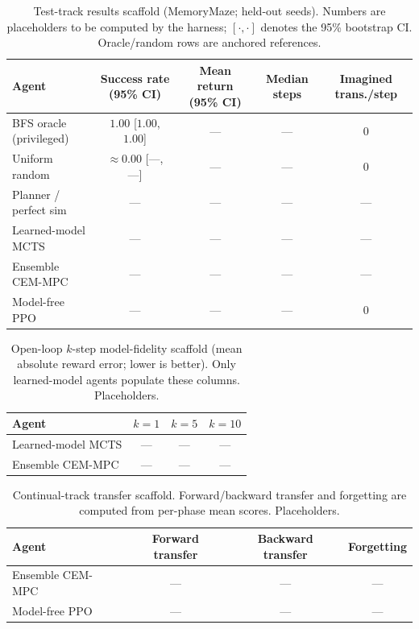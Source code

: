 \documentclass[11pt]{article}
\begin{document}
\begin{table}[t]
\centering
\caption{Test-track results scaffold (MemoryMaze; held-out seeds). Numbers are placeholders to be computed by the harness; $[\cdot,\cdot]$ denotes the 95\% bootstrap CI. Oracle/random rows are anchored references.}
\label{tab:results-memorymaze}
\begin{tabular}{lcccc}
\toprule
Agent & Success rate (95\% CI) & Mean return (95\% CI) & Median steps & Imagined trans./step \\
\midrule
BFS oracle (privileged)        & $1.00$ [$1.00$, $1.00$] & --- & --- & $0$ \\
Uniform random                 & $\approx 0.00$ [---, ---] & --- & --- & $0$ \\
Planner / perfect sim          & --- & --- & --- & --- \\
Learned-model MCTS             & --- & --- & --- & --- \\
Ensemble CEM-MPC               & --- & --- & --- & --- \\
Model-free PPO                 & --- & --- & --- & $0$ \\
\bottomrule
\end{tabular}
\end{table}

\begin{table}[t]
\centering
\caption{Open-loop $k$-step model-fidelity scaffold (mean absolute reward error; lower is better). Only learned-model agents populate these columns. Placeholders.}
\label{tab:fidelity}
\begin{tabular}{lccc}
\toprule
Agent & $k{=}1$ & $k{=}5$ & $k{=}10$ \\
\midrule
Learned-model MCTS  & --- & --- & --- \\
Ensemble CEM-MPC    & --- & --- & --- \\
\bottomrule
\end{tabular}
\end{table}

\begin{table}[t]
\centering
\caption{Continual-track transfer scaffold. Forward/backward transfer and forgetting are computed from per-phase mean scores. Placeholders.}
\label{tab:continual}
\begin{tabular}{lccc}
\toprule
Agent & Forward transfer & Backward transfer & Forgetting \\
\midrule
Ensemble CEM-MPC  & --- & --- & --- \\
Model-free PPO    & --- & --- & --- \\
\bottomrule
\end{tabular}
\end{table}
\end{document}
